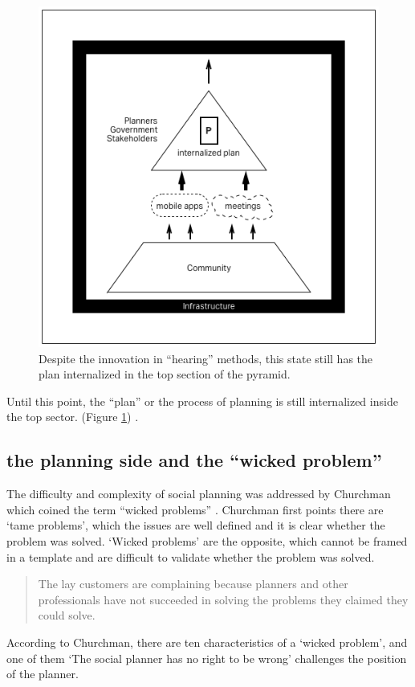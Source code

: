 \begin{figure}[!htb]
  \includegraphics[width=\textwidth]{chapters/2/fig/internalized_plan.png}               
  \caption[diagram: unstructured app]{Despite the innovation in ``hearing'' methods, this state still has the plan internalized in the top section of the pyramid.}
  \label{fig:internalized_plan}
\end{figure}

Until this point, the ``plan'' or the process of planning is still internalized inside the top sector. (Figure \ref{fig:internalized_plan}) .

\subsection{the planning side and the ``wicked problem''}\label{subsec:wicked}

The difficulty and complexity of social planning was addressed by Churchman which coined the term ``wicked problems'' \cite{churchman1967guest}. Churchman first points there are `tame problems', which the issues are well defined and it is clear whether the problem was solved. `Wicked problems' are the opposite, which cannot be framed in a template and are difficult to validate whether the problem was solved.  
\begin{quotation}
The lay customers are complaining because planners and other professionals have not succeeded in solving the problems they claimed they could solve.
\end{quotation}
According to Churchman, there are ten characteristics of a `wicked problem', and one of them `The social planner has no right to be wrong' challenges the position of the planner.

